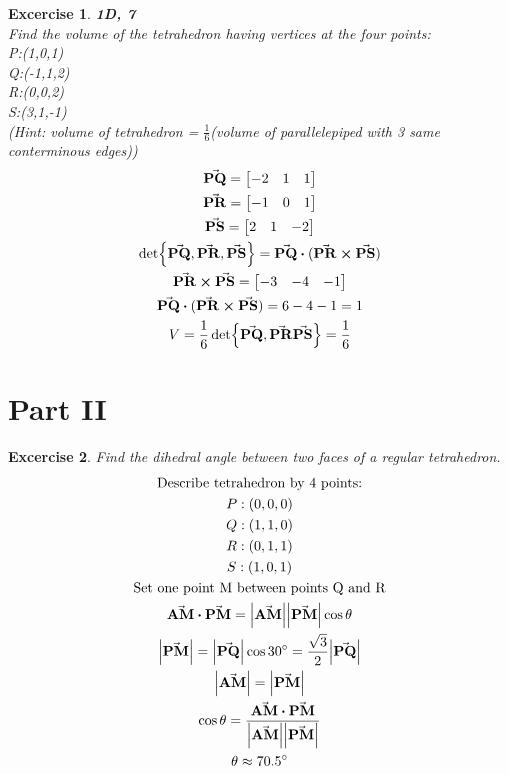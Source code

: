 \documentclass[11pt]{article}
\newtheorem{excercise}{Excercise}
\begin{document}
    \begin{excercise}
        \textbf{1D, 7}\\
        Find the volume of the tetrahedron having vertices at the four points:\\
        P:(1,0,1)\\
        Q:(-1,1,2)\\
        R:(0,0,2)\\
        S:(3,1,-1)\\
        (Hint: volume of tetrahedron = $\frac{1}{6}$(volume of parallelepiped with 3 same conterminous edges))\\
        \begin{gather}
            \va{PQ}=\bmqty{-2 & 1 & 1}\\
            \va{PR}=\bmqty{-1 & 0 & 1}\\
            \va{PS}=\bmqty{2 & 1 & -2}\\
            \det{\va{PQ}, \va{PR}, \va{PS}}=\va{PQ}\vdot(\va{PR}\cross\va{PS})\\
            \va{PR}\cross\va{PS}=\bmqty{-3 & -4 & -1}\\
            \va{PQ}\vdot(\va{PR}\cross\va{PS})
            =6 -4 -1 = 1\\
            V=\frac{1}{6}\det{\va{PQ},\va{PR}\va{PS}}=\frac{1}{6}
        \end{gather}
    \end{excercise}

    \section{Part II}

    \begin{excercise}
        Find the dihedral angle between two faces of a regular tetrahedron.\\
        \begin{gather}
            \text{Describe tetrahedron by 4 points:}\\
            P:(0, 0 ,0)\\
            Q:(1, 1, 0)\\
            R:(0, 1, 1)\\
            S:(1, 0, 1)\\
            \text{Set one point M between points Q and R}\\
            \va{AM}\vdot\va{PM}=\abs{\va{AM}}\abs{\va{PM}}\cos{\theta}\\
            \abs{\va{PM}}=\abs{\va{PQ}}\cos{\ang{30}}=\frac{\sqrt{3}}{2}\abs{\va{PQ}}\\
            \abs{\va{AM}}=\abs{\va{PM}}\\
            \cos{\theta}=\frac{\va{AM}\vdot\va{PM}}{\abs{\va{AM}}\abs{\va{PM}}}\\
            \theta\approx\ang{70.5}
        \end{gather}
    \end{excercise}
\end{document}
